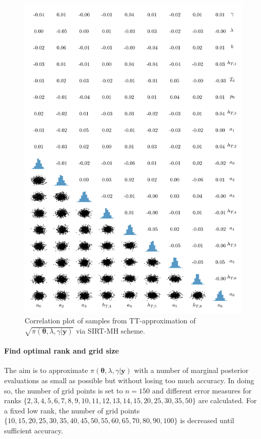 \begin{figure}%
	\includegraphics[]{2ndCorrPlot.png}
	\caption*{Correlation plot of samples from TT-approximation of $\sqrt{\pi(\bm{\theta},\lambda,\gamma | \bm{y})}$ via SIRT-MH scheme.}
\end{figure}



\paragraph{Find optimal rank and grid size}
The aim is to approximate $\pi( \bm{\theta},\lambda,\gamma  | \bm{y})$ with a number of marginal posterior evaluations as small as possible but without losing too much accuracy.
In doing so, the number of grid points is set to $n = 150$ and different error measures for ranks $\{2,3,4,5,6,7,8,9,10,11,12,13,14,15, 20, 25, 30, 35, 50\}$ are calculated.
For a fixed low rank, the number of grid points $\{10, 15, 20, 25, 30, 35, 40, 45, 50, 55, 60, 65, 70, 80, 90, 100\}$ is decreased until sufficient accuracy.

